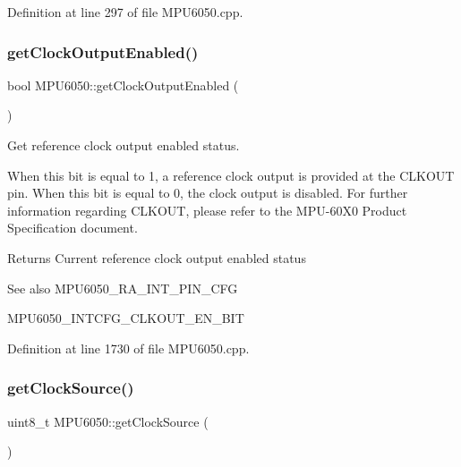 Definition at line 297 of file M\+P\+U6050.\+cpp.

\mbox{\label{classMPU6050_ada96c33957bf20c04ca598a3537358ef}} 
\subsubsection{\texorpdfstring{getClockOutputEnabled()}{getClockOutputEnabled()}}
{\footnotesize\ttfamily bool M\+P\+U6050\+::get\+Clock\+Output\+Enabled (\begin{DoxyParamCaption}{ }\end{DoxyParamCaption})}



Get reference clock output enabled status. 

When this bit is equal to 1, a reference clock output is provided at the C\+L\+K\+O\+UT pin. When this bit is equal to 0, the clock output is disabled. For further information regarding C\+L\+K\+O\+UT, please refer to the M\+P\+U-\/60\+X0 Product Specification document. \begin{DoxyReturn}{Returns}
Current reference clock output enabled status 
\end{DoxyReturn}
\begin{DoxySeeAlso}{See also}
M\+P\+U6050\+\_\+\+R\+A\+\_\+\+I\+N\+T\+\_\+\+P\+I\+N\+\_\+\+C\+FG 

M\+P\+U6050\+\_\+\+I\+N\+T\+C\+F\+G\+\_\+\+C\+L\+K\+O\+U\+T\+\_\+\+E\+N\+\_\+\+B\+IT 
\end{DoxySeeAlso}


Definition at line 1730 of file M\+P\+U6050.\+cpp.

\mbox{\label{classMPU6050_a8ed670258a805807b5102cdc5d0996a8}} 
\subsubsection{\texorpdfstring{getClockSource()}{getClockSource()}}
{\footnotesize\ttfamily uint8\+\_\+t M\+P\+U6050\+::get\+Clock\+Source (\begin{DoxyParamCaption}{ }\end{DoxyParamCaption})}



